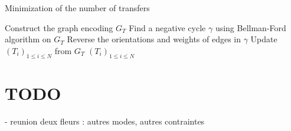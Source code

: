 \documentclass[]{article}
\begin{document}
\begin{algorithm}
	\caption{Minimization of the number of transfers}
	\label{alg:mini}
	\begin{algorithmic}[1]
		\State Construct the graph encoding $G_T$
		\Repeat \label{lin:repeat}
		\State Find a negative cycle $\gamma$ using Bellman-Ford algorithm on $G_T$
		\State Reverse the orientations and weights of edges in $\gamma$
		\State Update $(T_i)_{1\le i\le N}$ from $G_T$
		\State \Return $(T_i)_{1\le i\le N}$
		\EndFunction
	\end{algorithmic}
\end{algorithm}



\section{TODO}

- reunion deux fleurs : autres modes, autres contraintes
\end{document}
